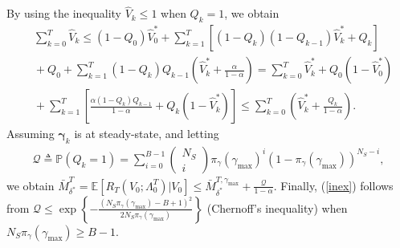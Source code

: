 \documentclass[10pt,twocolumn,twoside]{IEEEtran}
\theoremstyle{plain}
\begin{document}
By using the inequality $\hat V_k\leq 1$ when $Q_k=1$, we obtain
\begin{align*}
&\sum_{k=0}^{T}\hat V_k\leq
(1-Q_0)\hat V_0^*
\!+\!\sum_{k=1}^{T}\!\left[
(1-Q_k)(1-Q_{k-1})\hat V_k^*+Q_k
\right]
\nonumber\\&
\!+\!Q_0\!+\!\sum_{k=1}^{T}\!(1\!-\!Q_k)Q_{k-1}\!\left(\hat V_{k}^*\!+\!\frac{\alpha}{1-\alpha}\right)
\!\!=
\!\!\sum_{k=0}^{T}\hat V_k^*
\!+Q_0(1\!-\!\hat V_0^*)
\nonumber\\&
\!\!+\!\!\sum_{k=1}^{T}\!
\left[
\frac{\alpha(1-Q_k)Q_{k-1}}{1-\alpha}
+Q_k(1-\hat V_k^*)
\right]
\!\leq\!
  \sum_{k=0}^{T}\!\left(\hat V_k^*+\frac{Q_k}{1-\alpha}\right)\!.
\end{align*}
Assuming
$\boldsymbol{\gamma}_k$ is at steady-state,
and letting
\begin{align*}
\mathcal Q\triangleq \mathbb P(Q_k=1)\!
=\!\sum_{i=0}^{B-1}\left(\begin{array}{c}\!\!\!N_S\!\!\!\\i\end{array}\right)\pi_{\gamma}(\gamma_{\max})^i
(1\!-\!\pi_{\gamma}(\gamma_{\max}))^{N_S-i},
\end{align*}
we obtain
$\bar M_{\delta^*}^{T}=\mathbb E\!\left[R_T(V_0;\Lambda_0^T)|V_0\right]\leq
\bar M_{\delta^*}^{T,\gamma_{\max}}\!+\!\frac{\mathcal Q}{1\!-\!\alpha}
$. Finally, 
(\ref{inex}) follows from
$\mathcal Q\leq \exp\left\{-\frac{\left(N_S\pi_{\gamma}(\gamma_{\max})-B+1\right)^2}{2N_S\pi_{\gamma}(\gamma_{\max})}\right\}$ (Chernoff's inequality)
 when $N_S\pi_{\gamma}(\gamma_{\max})\geq B-1$.
\hfill\QED

\vspace{-3mm}
\end{document}
